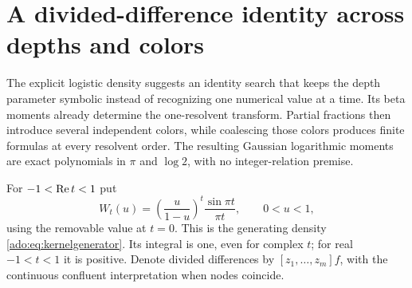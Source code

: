 \section{A divided-difference identity across depths and colors}
\label{logres:sec:main}
The explicit logistic density suggests an identity search that keeps the
depth parameter symbolic instead of recognizing one numerical value at a
time. Its beta moments already determine the one-resolvent transform.
Partial fractions then introduce several independent colors, while
coalescing those colors produces finite formulas at every resolvent order.
The resulting Gaussian logarithmic moments are exact polynomials in
$\pi$ and $\log2$, with no integer-relation premise.

For $-1<\operatorname{Re} t<1$ put
\[
 W_t(u)=\left(\frac{u}{1-u}\right)^t\frac{\sin\pi t}{\pi t},
 \qquad 0<u<1,
\]
using the removable value at $t=0$. This is the generating density
\eqref{ado:eq:kernelgenerator}. Its integral is one, even for complex $t$;
for real $-1<t<1$ it is positive. Denote divided differences by
$[z_1,\ldots,z_m]f$, with the continuous confluent interpretation when
nodes coincide.

